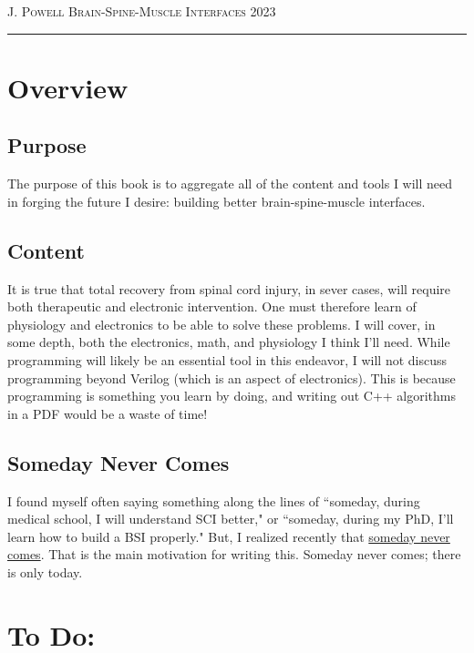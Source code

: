 \documentclass[12pt]{report}
\begin{document}
\pagebreak




{\scshape J. Powell} \hfill {\scshape \large Brain-Spine-Muscle Interfaces} \hfill {\scshape 2023}
 
\smallskip

\hrule
\bigskip
\normalsize 



\section{Overview}

\subsection{Purpose}
The purpose of this book is to aggregate all of the content and tools I will need in forging the future I desire: building better brain-spine-muscle interfaces. 

\subsection{Content}
It is true that total recovery from spinal cord injury, in sever cases, will require both therapeutic and electronic intervention. One must therefore learn of physiology and electronics to be able to solve these problems. I will cover, in some depth, both the electronics, math, and physiology I think I'll need. While programming will likely be an essential tool in this endeavor, I will not discuss programming beyond Verilog (which is an aspect of electronics). This is because programming is something you learn by doing, and writing out C++ algorithms in a PDF would be a waste of time!

\subsection{Someday Never Comes} 
I found myself often saying something along the lines of ``someday, during medical school, I will understand SCI better," or ``someday, during my PhD, I'll learn how to build a BSI properly." But, I realized recently that \href{https://www.youtube.com/watch?v=NwNuQulK6N0}{someday never comes}. That is the main motivation for writing this. Someday never comes; there is only today. 

\section{To Do:}
\end{document}
